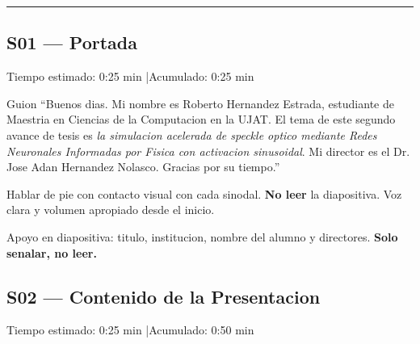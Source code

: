\vspace{6pt}
\hrule
\vspace{12pt}

\subsection{S01 --- Portada}

\begin{timebox}
Tiempo estimado: 0:25 min \quad|\quad Acumulado: 0:25 min
\end{timebox}
\vspace{4pt}

\begin{slidebox}{Guion}
``Buenos dias. Mi nombre es Roberto Hernandez Estrada, estudiante de Maestria en
Ciencias de la Computacion en la UJAT. El tema de este segundo avance de tesis es
\emph{la simulacion acelerada de speckle optico mediante Redes Neuronales Informadas
por Fisica con activacion sinusoidal}. Mi director es el Dr. Jose Adan Hernandez
Nolasco. Gracias por su tiempo.''
\end{slidebox}
\vspace{4pt}

\begin{tipbox}
Hablar de pie con contacto visual con cada sinodal. \textbf{No leer} la diapositiva.
Voz clara y volumen apropiado desde el inicio.
\end{tipbox}

\begin{warningbox}
Apoyo en diapositiva: titulo, institucion, nombre del alumno y directores.
\textbf{Solo senalar, no leer.}
\end{warningbox}

\vspace{8pt}

\subsection{S02 --- Contenido de la Presentacion}

\begin{timebox}
Tiempo estimado: 0:25 min \quad|\quad Acumulado: 0:50 min
\end{timebox}
\vspace{4pt}


